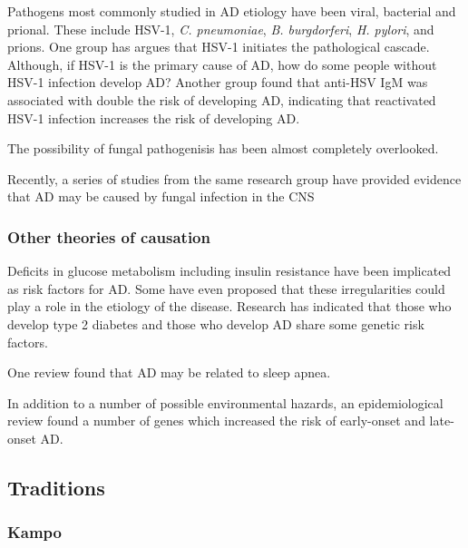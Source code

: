 \documentclass[twocolumn]{article}
\begin{document}
Pathogens most commonly studied in AD etiology have been
viral, bacterial and prional. These include
HSV-1,
\textit{C. pneumoniae},
\textit{B. burgdorferi},
\textit{H. pylori},
and prions.
One group has argues that HSV-1 initiates the pathological
cascade.
\cite{ball2013intracerebral}
Although, if HSV-1 is the primary cause of AD,
how do some people without HSV-1 infection develop AD?
Another group found that anti-HSV IgM was associated with
double the risk of developing AD, indicating that
reactivated HSV-1 infection increases the risk of developing AD.
\cite{lovheim2014reactivated}

The possibility of fungal pathogenisis
has been almost completely overlooked.
\cite{mawanda2013can}

Recently, a series of studies from the same research
group have provided evidence that AD may be caused
by fungal infection in the CNS
\cite{
pisa2015different,
alonso2013fungal,
pisa2015direct
}




\subsubsection{Other theories of causation}

Deficits in glucose metabolism including
insulin resistance have been implicated as
risk factors for AD.
\cite{erickson2013blood}
Some have even proposed that
these irregularities could play a role in
the etiology of the disease.
\cite{luque2014oxidative}
Research has indicated that those who develop
type 2 diabetes and those who develop AD
share some genetic risk factors.
\cite{hao2015shared}


One review found that AD may be related to sleep apnea.
\cite{pan2014can}


In addition to a number of possible environmental hazards,
an epidemiological review found a number of genes which
increased the risk of early-onset and late-onset AD.
\cite{jiang2013epidemiology}




\subsection{Traditions}
\subsubsection{Kampo}
\end{document}
